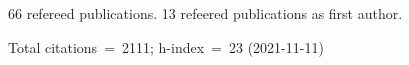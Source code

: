 66 refereed publications. 13 refeered publications as first author.

Total citations~=~2111; h-index~=~23 (2021-11-11)
